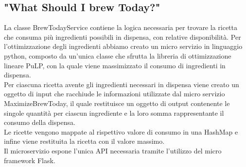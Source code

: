 \documentclass{article}
\begin{document}
\subsection{"What Should I brew Today?"}
La classe BrewTodayService contiene la logica necessaria per trovare la ricetta che consuma più ingredienti possibili in dispensa, con relative disponibilità. Per l’ottimizzazione degli ingredienti abbiamo creato un micro servizio in linguaggio python, composto da un’unica classe che sfrutta la libreria di ottimizzazione lineare PuLP, con la quale viene massimizzato il consumo di ingredienti in dispensa.\\
Per ciascuna ricetta avente gli ingredienti necessari in dispensa viene creato un oggetto di input che racchiude le informazioni utilizzate dal micro servizio MaximizeBrewToday, il quale restituisce un oggetto di output contenente le singole quantità per ciascun ingrediente e la loro somma rappresentante il consumo della dispensa.\\
Le ricette vengono mappate al rispettivo valore di consumo in una HashMap e infine viene restituita la ricetta con il valore massimo.\\
Il microservizio espone l’unica API necessaria tramite l’utilizzo del micro framework Flask.
\end{document}
